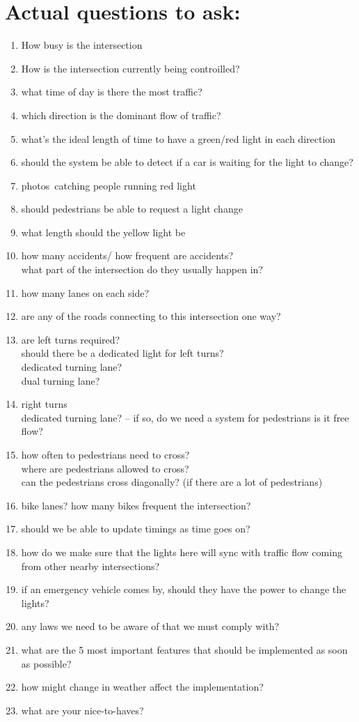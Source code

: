 \documentclass[letterpaper]{article}
\begin{document}
\section{Actual questions to ask:}
\begin{enumerate}
 \item How busy is the intersection
 \item How is the intersection currently being controilled?
 \item what time of day is there the most traffic?
 \item which direction is the dominant flow of traffic?
 \item what's the ideal length of time to have a green/red light in each direction
 \item should the system be able to detect if a car is waiting for the light to change?
 \item photos\ catching people running red light
 \item should pedestrians be able to request a light change
 \item what length should the yellow light be
 \item how many accidents/ how frequent are accidents?\\
       what part of the intersection do they usually happen in?
 \item how many lanes on each side?
 \item are any of the roads connecting to this intersection one way?
 \item are left turns required?\\
       should there be a dedicated light for left turns?\\
       dedicated turning lane?\\
       dual turning lane?
 \item right turns\\
       dedicated turning lane? -- if so, do we need a system for pedestrians
       is it free flow?
       
 \item how often to pedestrians need to cross?\\
       where are pedestrians allowed to cross?\\
       can the pedestrians cross diagonally? (if there are a lot of pedestrians)
 \item bike lanes? how many bikes frequent the intersection?
 \item should we be able to update timings as time goes on?
 \item how do we make sure that the lights here will sync with traffic flow
       coming from other nearby intersections?
 \item if an emergency vehicle comes by, should they have the power to change the lights?
 \item any laws we need to be aware of that we must comply with?
 \item what are the 5 most important features that should be implemented as soon as possible?
 \item how might change in weather affect the implementation?
 \item what are your nice-to-haves?
\end{enumerate}
\end{document}
